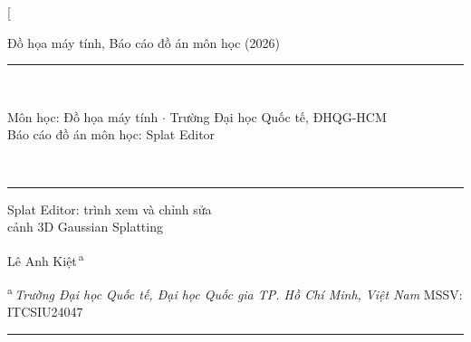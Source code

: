 \documentclass[9pt,twocolumn,a4paper]{extarticle}
\begin{document}
\thispagestyle{first}

\twocolumn[{%
\begin{@twocolumnfalse}
\vspace{-0.3cm}
\begin{center}\small\color{linkblue}Đồ họa máy tính, Báo cáo đồ án môn học (2026)\end{center}
\vspace{-0.1cm}
\noindent\rule{\textwidth}{0.5pt}\\[-2pt]
\noindent\colorbox{bannergray}{\parbox{\dimexpr\textwidth-2\fboxsep}{\centering\vspace{3pt}
  {\small Môn học: Đồ họa máy tính \;$\cdot$\; Trường Đại học Quốc tế, ĐHQG-HCM}\\[7pt]
  {\Large Báo cáo đồ án môn học: Splat Editor}\vspace{4pt}}}\\[-1pt]
\noindent\rule{\textwidth}{2.2pt}

\vspace{0.55cm}
{\fontsize{16.5}{20}\selectfont Splat Editor: trình xem và chỉnh sửa\\cảnh 3D Gaussian Splatting\par}
\vspace{0.4cm}
{\large Lê Anh Kiệt\textsuperscript{\,a}\par}
\vspace{0.2cm}
{\scriptsize\textsuperscript{a}\,\textit{Trường Đại học Quốc tế, Đại học Quốc gia TP. Hồ Chí Minh, Việt Nam} \quad MSSV: ITCSIU24047\par}
\vspace{0.3cm}
\noindent\rule{\textwidth}{0.4pt}
\vspace{0.25cm}


\end{@twocolumnfalse}}
\end{document}
